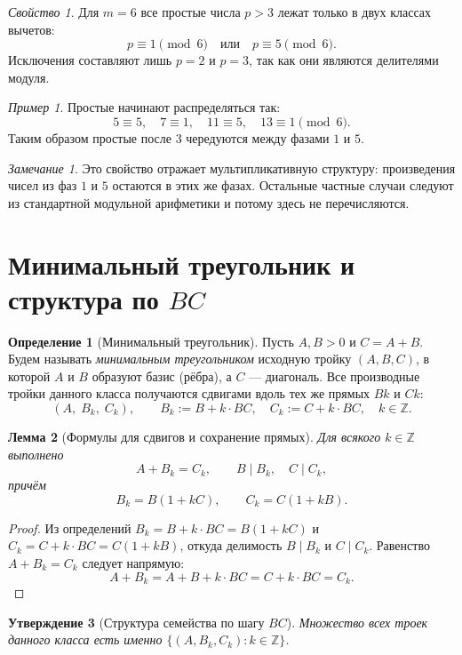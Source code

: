 \documentclass[12pt,a4paper]{article}
\newcommand{\Z}{\mathbb{Z}}
\theoremstyle{definition}
\newtheorem{definition}{Определение}[section]
\theoremstyle{plain}
\newtheorem{lemma}[definition]{Лемма}
\newtheorem{proposition}[definition]{Утверждение}
\theoremstyle{remark}
\newtheorem*{remark}{Замечание}
\newtheorem*{example}{Пример}
\newtheorem*{property}{Свойство}
\begin{document}
\begin{property}
Для $m=6$ все простые числа $p>3$ лежат только в двух классах вычетов:
\[
p\equiv 1 \pmod 6 \quad \text{или} \quad p\equiv 5 \pmod 6.
\]
Исключения составляют лишь $p=2$ и $p=3$, так как они являются делителями модуля.
\end{property}

\begin{example}
Простые начинают распределяться так:
\[
5\equiv 5,\quad 7\equiv 1,\quad 11\equiv 5,\quad 13\equiv 1 \pmod 6.
\]
Таким образом простые после $3$ чередуются между фазами $1$ и $5$.
\end{example}

\begin{remark}
Это свойство отражает мультипликативную структуру: произведения чисел из фаз $1$ и $5$
остаются в этих же фазах. Остальные частные случаи следуют из стандартной модульной арифметики
и потому здесь не перечисляются.
\end{remark}



\section{Минимальный треугольник и структура по $BC$}

\begin{definition}[Минимальный треугольник]
Пусть $A,B>0$ и $C=A+B$. Будем называть \emph{минимальным треугольником} исходную тройку $(A,B,C)$,
в которой $A$ и $B$ образуют базис (рёбра), а $C$ — диагональ. Все производные тройки данного класса
получаются сдвигами вдоль тех же прямых $Bk$ и $Ck$:
\[
(A,\;B_k,\;C_k),\qquad B_k:=B+k\cdot BC,\quad C_k:=C+k\cdot BC,\quad k\in\Z.
\]
\end{definition}

\begin{lemma}[Формулы для сдвигов и сохранение прямых]\label{lem:BC-formulas}
Для всякого $k\in\Z$ выполнено
\[
A+B_k=C_k,\qquad B\mid B_k,\quad C\mid C_k,
\]
причём
\[
B_k=B(1+kC),\qquad C_k=C(1+kB).
\]
\end{lemma}

\begin{proof}
Из определений $B_k=B+k\cdot BC=B(1+kC)$ и $C_k=C+k\cdot BC=C(1+kB)$, откуда делимость $B\mid B_k$ и $C\mid C_k$.
Равенство $A+B_k=C_k$ следует напрямую:
\[
A+B_k=A+B+k\cdot BC=C+k\cdot BC=C_k.
\]
\end{proof}

\begin{proposition}[Структура семейства по шагу $BC$]\label{prop:family}
Множество всех троек данного класса есть именно $\{(A,B_k,C_k):k\in\Z\}$.
\end{proposition}
\end{document}
